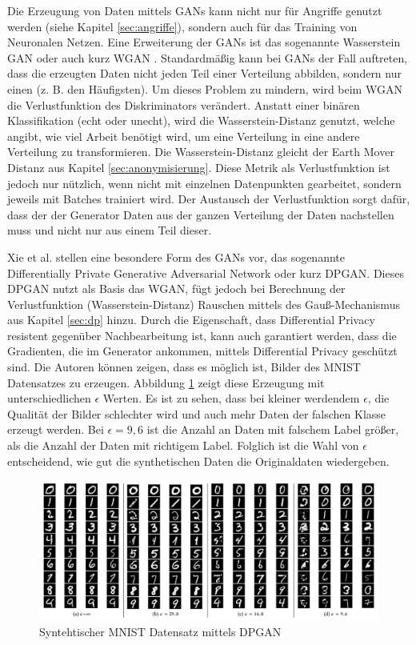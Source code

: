 Die Erzeugung von Daten mittels GANs kann nicht nur für Angriffe genutzt werden (siehe Kapitel \ref{sec:angriffe}), sondern auch für das Training von Neuronalen Netzen.
Eine Erweiterung der GANs ist das sogenannte Wasserstein GAN oder auch kurz WGAN \cite{P-92}. 
Standardmäßig kann bei GANs der Fall auftreten, dass die erzeugten Daten nicht jeden Teil einer Verteilung abbilden, sondern nur einen (z. B. den Häufigsten).
Um dieses Problem zu mindern, wird beim WGAN die Verlustfunktion des Diskriminators verändert. 
Anstatt einer binären Klassifikation (echt oder unecht), wird die Wasserstein-Distanz genutzt, welche angibt, wie viel Arbeit benötigt wird, um eine Verteilung in eine andere Verteilung zu transformieren. 
Die Wasserstein-Distanz gleicht der Earth Mover Distanz aus Kapitel \ref{sec:anonymisierung}.
Diese Metrik als Verlustfunktion ist jedoch nur nützlich, wenn nicht mit einzelnen Datenpunkten gearbeitet, sondern jeweils mit Batches trainiert wird.
Der Austausch der Verlustfunktion sorgt dafür, dass der der Generator Daten aus der ganzen Verteilung der Daten nachstellen muss und nicht nur aus einem Teil dieser.


Xie et al. \cite{P-70} stellen eine besondere Form des GANs vor, das sogenannte Differentially Private Generative Adversarial Network oder kurz DPGAN.
Dieses DPGAN nutzt als Basis das WGAN, fügt jedoch bei Berechnung der Verlustfunktion (Wasserstein-Distanz) Rauschen mittels des Gauß-Mechanismus aus Kapitel \ref{sec:dp} hinzu.
Durch die Eigenschaft, dass Differential Privacy resistent gegenüber Nachbearbeitung ist, kann auch garantiert werden, dass die Gradienten, die im Generator ankommen, mittels Differential Privacy geschützt sind.
Die Autoren können zeigen, dass es möglich ist, Bilder des MNIST Datensatzes zu erzeugen.
Abbildung \ref{fig:dpgan} zeigt diese Erzeugung mit unterschiedlichen $\epsilon$ Werten.
Es ist zu sehen, dass bei kleiner werdendem $\epsilon$, die Qualität der Bilder schlechter wird und auch mehr Daten der falschen Klasse erzeugt werden. 
Bei $\epsilon=9,6$ ist die Anzahl an Daten mit falschem Label größer, als die Anzahl der Daten mit richtigem Label.
Folglich ist die Wahl von $\epsilon$ entscheidend, wie gut die synthetischen Daten die Originaldaten wiedergeben.

\begin{figure}[!htb]
    \centering
    \includegraphics[width=15cm]{figures/dpgan}
    \caption{Syntehtischer MNIST Datensatz mittels DPGAN \cite{P-70}}
    \label{fig:dpgan}
\end{figure} 

